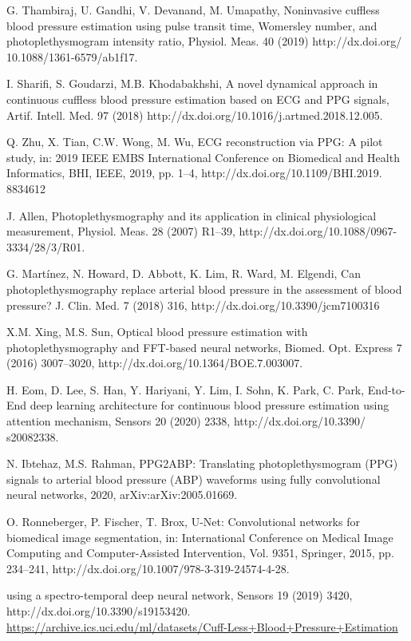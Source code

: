  G. Thambiraj, U. Gandhi, V. Devanand, M. Umapathy, Noninvasive cuffless
blood pressure estimation using pulse transit time, Womersley number, and
photoplethysmogram intensity ratio, Physiol. Meas. 40 (2019) http://dx.doi.org/
10.1088/1361-6579/ab1f17.

 I. Sharifi, S. Goudarzi, M.B. Khodabakhshi, A novel dynamical approach in
continuous cuffless blood pressure estimation based on ECG and PPG signals,
Artif. Intell. Med. 97 (2018) http://dx.doi.org/10.1016/j.artmed.2018.12.005.

 Q. Zhu, X. Tian, C.W. Wong, M. Wu, ECG reconstruction via PPG: A pilot
study, in: 2019 IEEE EMBS International Conference on Biomedical and Health
Informatics, BHI, IEEE, 2019, pp. 1–4, http://dx.doi.org/10.1109/BHI.2019.
8834612

 J. Allen, Photoplethysmography and its application in clinical physiological
measurement, Physiol. Meas. 28 (2007) R1–39, http://dx.doi.org/10.1088/0967-
3334/28/3/R01.

 G. Martínez, N. Howard, D. Abbott, K. Lim, R. Ward, M. Elgendi, Can photoplethysmography
replace arterial blood pressure in the assessment of blood
pressure? J. Clin. Med. 7 (2018) 316, http://dx.doi.org/10.3390/jcm7100316

 X.M. Xing, M.S. Sun, Optical blood pressure estimation with photoplethysmography
and FFT-based neural networks, Biomed. Opt. Express 7 (2016) 3007–3020,
http://dx.doi.org/10.1364/BOE.7.003007.

 H. Eom, D. Lee, S. Han, Y. Hariyani, Y. Lim, I. Sohn, K. Park, C. Park,
End-to-End deep learning architecture for continuous blood pressure estimation
using attention mechanism, Sensors 20 (2020) 2338, http://dx.doi.org/10.3390/
s20082338.

 N. Ibtehaz, M.S. Rahman, PPG2ABP: Translating photoplethysmogram (PPG)
signals to arterial blood pressure (ABP) waveforms using fully convolutional
neural networks, 2020, arXiv:arXiv:2005.01669.

 O. Ronneberger, P. Fischer, T. Brox, U-Net: Convolutional networks for
biomedical image segmentation, in: International Conference on Medical Image
Computing and Computer-Assisted Intervention, Vol. 9351, Springer, 2015, pp.
234–241, http://dx.doi.org/10.1007/978-3-319-24574-4-28.

using a spectro-temporal deep neural network, Sensors 19 (2019)
3420, http://dx.doi.org/10.3390/s19153420.
 \url{https://archive.ics.uci.edu/ml/datasets/Cuff-Less+Blood+Pressure+Estimation}